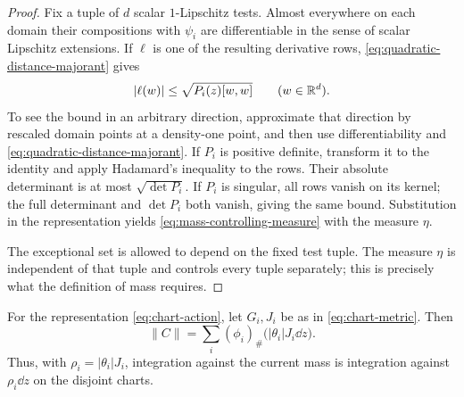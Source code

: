 \begin{proof}
Fix a tuple of \(d\) scalar \(1\)-Lipschitz tests. Almost everywhere on
each domain their compositions with \(\psi_i\) are differentiable in
the sense of scalar Lipschitz extensions. If \(\ell\) is one of the
resulting derivative rows, \eqref{eq:quadratic-distance-majorant} gives
\[
 |\ell(w)|\le\sqrt{P_i(z)[w,w]}\qquad(w\in\mathbb R^d).
\]
To see the bound in an arbitrary direction, approximate that direction
by rescaled domain points at a density-one point, and then use
differentiability and \eqref{eq:quadratic-distance-majorant}.
If \(P_i\) is positive definite, transform it to the identity and apply
Hadamard's inequality to the rows. Their absolute determinant is at most
\(\sqrt{\det P_i}\). If \(P_i\) is singular, all rows vanish on its
kernel; the full determinant and \(\det P_i\) both vanish, giving the
same bound. Substitution in the representation yields
\eqref{eq:mass-controlling-measure} with the measure \(\eta\).

The exceptional set is allowed to depend on the fixed test tuple. The
measure \(\eta\) is independent of that tuple and controls every tuple
separately; this is precisely what the definition of mass requires.
\end{proof}

\begin{proposition}
\label{prop:chart-mass}
For the representation \eqref{eq:chart-action}, let \(G_i,J_i\) be as
in \eqref{eq:chart-metric}. Then
\begin{equation}
\label{eq:chart-mass}
 \|C\|=\sum_i(\phi_i)_\#\bigl(|\theta_i|J_i\dd z\bigr).
\end{equation}
Thus, with \(\rho_i=|\theta_i|J_i\), integration against the current
mass is integration against \(\rho_i\dd z\) on the disjoint charts.
\end{proposition}

